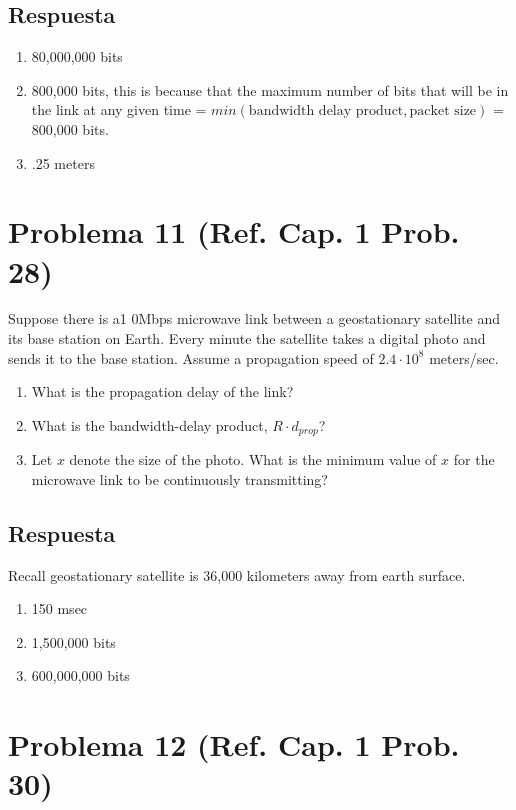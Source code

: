 \documentclass[10pt,spanish]{article}
\numberwithin{figure}{section} %
\begin{document}
\subsection*{Respuesta}

\begin{enumerate}
\item 80,000,000 bits
\item 800,000 bits, this is because that the maximum number of bits that will be in the link at any given time = $min(\text{bandwidth delay product}, \text{packet size})$ = 800,000 bits.
\item .25 meters
\end{enumerate}

\section[Problema 11]{Problema 11 \textnormal{\Large{(Ref. Cap. 1 Prob. 28)}}}

Suppose there is a1 0Mbps microwave link between a geostationary satellite and its base station on Earth. Every minute the satellite takes a digital photo and sends it to the base station. Assume a propagation speed of $2.4 \cdot 10^8$ meters/sec.

\begin{enumerate}
\item What is the propagation delay of the link?
\item What is the bandwidth-delay product, $R \cdot d_{prop}$?
\item Let $x$ denote the size of the photo. What is the minimum value of $x$ for the microwave link to be continuously transmitting?
\end{enumerate}

\subsection*{Respuesta}

Recall geostationary satellite is 36,000 kilometers away from earth surface.
\begin{enumerate}
\item 150 msec
\item 1,500,000 bits
\item 600,000,000 bits
\end{enumerate}

\newpage

\section[Problema 12]{Problema 12 \textnormal{\Large{(Ref. Cap. 1 Prob. 30)}}}
\end{document}
